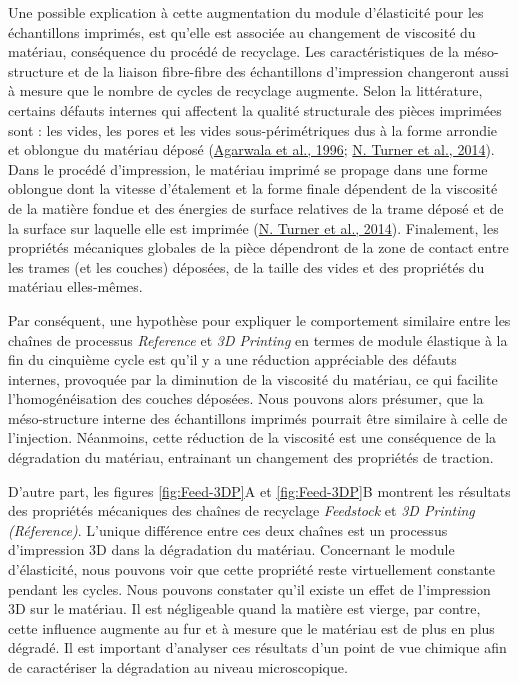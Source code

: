 \documentclass[
]{article}
\begin{document}
Une possible explication à cette augmentation du module d'élasticité pour les échantillons imprimés, est qu'elle est associée au changement de viscosité du matériau, conséquence du procédé de recyclage.
Les caractéristiques de la méso-structure et de la liaison fibre-fibre des échantillons d'impression changeront aussi à mesure que le nombre de cycles de recyclage augmente.
Selon la littérature, certains défauts internes qui affectent la qualité structurale des pièces imprimées sont : les vides, les pores et les vides sous-périmétriques dus à la forme arrondie et oblongue du matériau déposé (\protect\hyperlink{ref-Agarwala1996}{Agarwala et al., 1996}; \protect\hyperlink{ref-NTurner2014}{N. Turner et al., 2014}).
Dans le procédé d'impression, le matériau imprimé se propage dans une forme oblongue dont la vitesse d'étalement et la forme finale dépendent de la viscosité de la matière fondue et des énergies de surface relatives de la trame déposé et de la surface sur laquelle elle est imprimée (\protect\hyperlink{ref-NTurner2014}{N. Turner et al., 2014}).
Finalement, les propriétés mécaniques globales de la pièce dépendront de la zone de contact entre les trames (et les couches) déposées, de la taille des vides et des propriétés du matériau elles-mêmes.

Par conséquent, une hypothèse pour expliquer le comportement similaire entre les chaînes de processus \emph{Reference} et \emph{3D Printing} en termes de module élastique à la fin du cinquième cycle est qu'il y a une réduction appréciable des défauts internes, provoquée par la diminution de la viscosité du matériau, ce qui facilite l'homogénéisation des couches déposées.
Nous pouvons alors présumer, que la méso-structure interne des échantillons imprimés pourrait être similaire à celle de l'injection.
Néanmoins, cette réduction de la viscosité est une conséquence de la dégradation du matériau, entrainant un changement des propriétés de traction.

D'autre part, les figures \ref{fig:Feed-3DP}A et \ref{fig:Feed-3DP}B montrent les résultats des propriétés mécaniques des chaînes de recyclage \emph{Feedstock} et \emph{3D Printing (Réference)}.
L'unique différence entre ces deux chaînes est un processus d'impression 3D dans la dégradation du matériau.
Concernant le module d'élasticité, nous pouvons voir que cette propriété reste virtuellement constante pendant les cycles.
Nous pouvons constater qu'il existe un effet de l'impression 3D sur le matériau.
Il est négligeable quand la matière est vierge, par contre, cette influence augmente au fur et à mesure que le matériau est de plus en plus dégradé. Il est important d'analyser ces résultats d'un point de vue chimique afin de caractériser la dégradation au niveau microscopique.
\end{document}
